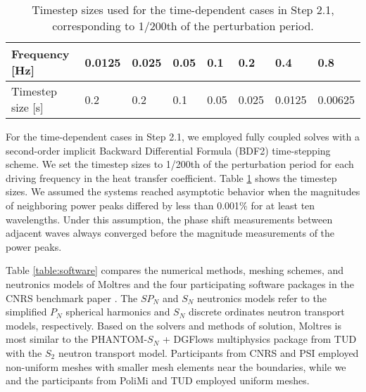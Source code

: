 \begin{table}[tb]
    \caption{Timestep sizes used for the time-dependent cases in
    Step 2.1, corresponding to 1/200th of the perturbation period.}
	\centering
	\setlength\tabcolsep{2.5pt}
	\begin{tabular}{l l l l l l l l}
	    \toprule
	    Frequency [Hz] & 0.0125 & 0.025 & 0.05 & 0.1 & 0.2 & 0.4 & 0.8 \\
	    \midrule
	    Timestep size [s] & 0.2 & 0.2 & 0.1 & 0.05 & 0.025 & 0.0125 & 0.00625
	    \\
	    \bottomrule
	\end{tabular}
	\label{table:timestep}
\end{table}

For the time-dependent cases in Step 2.1, we employed fully coupled solves with
a second-order implicit Backward Differential Formula (BDF2) time-stepping
scheme. We set the timestep sizes to 1/200th of the perturbation period for
each driving frequency in the heat transfer coefficient. Table
\ref{table:timestep} shows the timestep sizes. We assumed the
systems reached asymptotic behavior when the magnitudes of neighboring power
peaks differed by less than 0.001\% for at least ten wavelengths. Under this
assumption, the phase shift measurements between adjacent waves always
converged before the magnitude measurements of the power peaks.

Table \ref{table:software} compares the numerical methods, meshing schemes, and
neutronics models of Moltres and the four participating software packages in
the CNRS benchmark paper \cite{tiberga_results_2020}. The $SP_N$ and
$S_N$ neutronics models refer to the simplified $P_N$ spherical harmonics and
$S_N$ discrete ordinates neutron transport models, respectively. Based on the
solvers and methods of solution, Moltres is most similar to the
PHANTOM-$S_N$ + DGFlows \cite{tiberga_discontinuous_2019} multiphysics package
from \gls{TUD} with the $S_2$ neutron transport model. Participants from
\gls{CNRS} and \gls{PSI} employed non-uniform meshes with smaller mesh elements
near the boundaries, while we and
the participants from \gls{PoliMi} and \gls{TUD} employed uniform meshes.

\FloatBarrier

